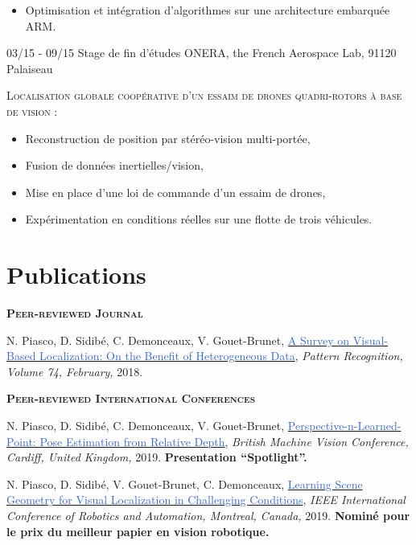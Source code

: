 \documentclass[]{friggeri-cv-cust}
\begin{document}
\begin{entrylist}
{\begin{itemize}[label=$\rhd$]
        \item Optimisation et intégration d'algorithmes sur une architecture embarquée ARM.
    \end{itemize} \vspace{5pt}}
  \entry
    {03/15 - 09/15}
    {Stage de fin d'études}
    {ONERA, the French Aerospace Lab, 91120 Palaiseau}
    {\textsc{Localisation globale coopérative d’un essaim de drones quadri-rotors à base de vision :}
    \begin{itemize}[label=$\rhd$]
    	\item Reconstruction de position par stéréo-vision multi-portée,
    	\item Fusion de données inertielles/vision,
        \item Mise en place d’une loi de commande d’un essaim de drones, 
        \item Expérimentation en conditions réelles sur une flotte de trois véhicules.
    \end{itemize} \vspace{5pt}}
\end{entrylist}

\newpage
\section{Publications}
    \textsc{\textbf{Peer-reviewed Journal}}
    
    {\footnotesize{N. Piasco, D. Sidibé, C. Demonceaux, V. Gouet-Brunet, \href{http://recherche.ign.fr/labos/matis/pdf/articles_revues/2017/PSDG17.pdf}{\textcolor{highlight}{A Survey on Visual-Based Localization: On the Benefit of Heterogeneous Data}},
\textit{Pattern Recognition, Volume 74, February,} 2018.}}
	
	\vspace{0.5cm}
    \textsc{\textbf{Peer-reviewed International Conferences}}
   
    {\footnotesize{N. Piasco, D. Sidibé, C. Demonceaux, V. Gouet-Brunet, \href{https://hal.archives-ouvertes.fr/hal-02190840}{\textcolor{highlight}{Perspective-n-Learned-Point: Pose Estimation from Relative Depth}},
    \textit{British Machine Vision Conference, Cardiff, United Kingdom,} 2019. \textbf{Presentation ``Spotlight''.}}}
        
    
    {\footnotesize{N. Piasco, D. Sidibé, V. Gouet-Brunet, C. Demonceaux, \href{http://recherche.ign.fr/labos/matis/pdf/articles_conf/2019/root.pdf}{\textcolor{highlight}{Learning Scene Geometry for Visual Localization in Challenging Conditions}},
\textit{IEEE International Conference of Robotics and Automation, Montreal, Canada,} 2019. \textbf{Nominé pour le prix du meilleur papier en vision robotique.}}}
\end{document}
